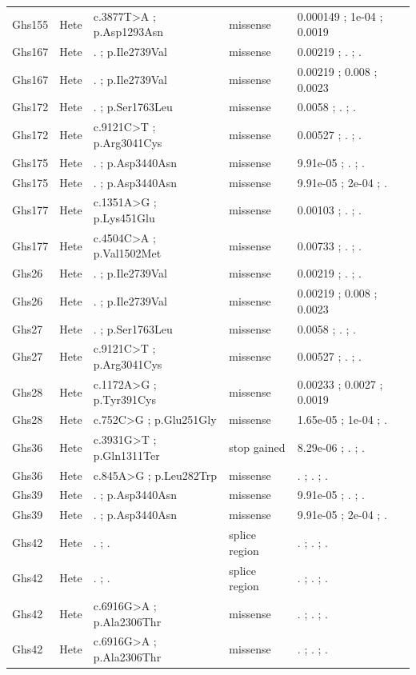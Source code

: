 \documentclass[12pt,twoside]{reedthesis}
\theoremstyle{definition}
\theoremstyle{definition}
\theoremstyle{remark}
\begin{document}
\begin{landscape}
\begin{longtable}[t]{lllll}
  Ghs155 & Hete & c.3877T>A ; p.Asp1293Asn & missense & 0.000149 ; 1e-04 ; 0.0019\\
  \addlinespace
  Ghs167 & Hete & . ; p.Ile2739Val & missense & 0.00219 ; . ; .\\
  Ghs167 & Hete & . ; p.Ile2739Val & missense & 0.00219 ; 0.008 ; 0.0023\\
  Ghs172 & Hete & . ; p.Ser1763Leu & missense & 0.0058 ; . ; .\\
  Ghs172 & Hete & c.9121C>T ; p.Arg3041Cys & missense & 0.00527 ; . ; .\\
  Ghs175 & Hete & . ; p.Asp3440Asn & missense & 9.91e-05 ; . ; .\\
  \addlinespace
  Ghs175 & Hete & . ; p.Asp3440Asn & missense & 9.91e-05 ; 2e-04 ; .\\
  Ghs177 & Hete & c.1351A>G ; p.Lys451Glu & missense & 0.00103 ; . ; .\\
  Ghs177 & Hete & c.4504C>A ; p.Val1502Met & missense & 0.00733 ; . ; .\\
  Ghs26 & Hete & . ; p.Ile2739Val & missense & 0.00219 ; . ; .\\
  Ghs26 & Hete & . ; p.Ile2739Val & missense & 0.00219 ; 0.008 ; 0.0023\\
  \addlinespace
  Ghs27 & Hete & . ; p.Ser1763Leu & missense & 0.0058 ; . ; .\\
  Ghs27 & Hete & c.9121C>T ; p.Arg3041Cys & missense & 0.00527 ; . ; .\\
  Ghs28 & Hete & c.1172A>G ; p.Tyr391Cys & missense & 0.00233 ; 0.0027 ; 0.0019\\
  Ghs28 & Hete & c.752C>G ; p.Glu251Gly & missense & 1.65e-05 ; 1e-04 ; .\\
  Ghs36 & Hete & c.3931G>T ; p.Gln1311Ter & stop gained & 8.29e-06 ; . ; .\\
  \addlinespace
  Ghs36 & Hete & c.845A>G ; p.Leu282Trp & missense & . ; . ; .\\
  Ghs39 & Hete & . ; p.Asp3440Asn & missense & 9.91e-05 ; . ; .\\
  Ghs39 & Hete & . ; p.Asp3440Asn & missense & 9.91e-05 ; 2e-04 ; .\\
  Ghs42 & Hete & . ; . & splice region & . ; . ; .\\
  Ghs42 & Hete & . ; . & splice region & . ; . ; .\\
  \addlinespace
  Ghs42 & Hete & c.6916G>A ; p.Ala2306Thr & missense & . ; . ; .\\
  Ghs42 & Hete & c.6916G>A ; p.Ala2306Thr & missense & . ; . ; .\\

\end{longtable}
\end{landscape}
\end{document}
